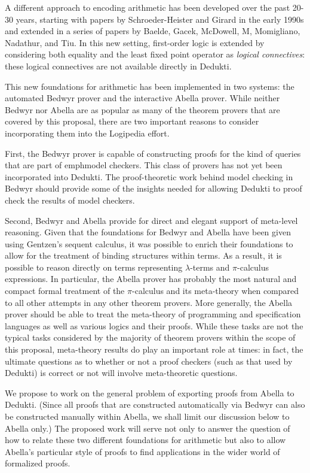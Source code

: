 \begin{workpackage}[id=theories,wphases=0-48,type=RTD,
  short=Theories in Dedukti,%
  title= Defining theories in Dedukti,
  lead=UIn,
  UInRM=10]
\begin{tasklist}
\begin{task}[id=abella,title=Express the theory of Abella in Dedukti and instrument the system]
A different approach to encoding arithmetic has been developed over
the past 20-30 years, starting with papers by Schroeder-Heister and
Girard in the early 1990s and extended in a series of papers by
Baelde, Gacek, McDowell, M, Momigliano, Nadathur, and Tiu.  In this
new setting, first-order logic is extended by considering both
equality and the least fixed point operator as \emph{logical
  connectives}: these logical connectives are not available directly
in Dedukti.

This new foundations for arithmetic has been implemented in two
systems: the automated Bedwyr prover and the interactive Abella
prover.  While neither Bedwyr nor Abella are as popular as many of the
theorem provers that are covered by this proposal, there are two
important reasons to consider incorporating them into the Logipedia
effort.

First, the Bedwyr prover is capable of constructing proofs for the
kind of queries that are part of emph{model checkers}.  This class of
provers has not yet been incorporated into Dedukti.  The
proof-theoretic work behind model checking in Bedwyr should provide
some of the insights needed for allowing Dedukti to proof check the
results of model checkers.

Second, Bedwyr and Abella provide for direct and elegant support of
meta-level reasoning.  Given that the foundations for Bedwyr and
Abella have been given using Gentzen's sequent calculus, it was
possible to enrich their foundations to allow for the treatment of
binding structures within terms.  As a result, it is possible to
reason directly on terms representing $\lambda$-terms and
$\pi$-calculus expressions.  In particular, the Abella prover has
probably the most natural and compact formal treatment of the
$\pi$-calculus and its meta-theory when compared to all other attempts
in any other theorem provers.  More generally, the Abella prover
should be able to treat the meta-theory of programming and
specification languages as well as various logics and their
proofs. While these tasks are not the typical tasks considered by the
majority of theorem provers within the scope of this proposal,
meta-theory results do play an important role at times: in fact, the
ultimate questions as to whether or not a proof checkers (such as that
used by Dedukti) is correct or not will involve meta-theoretic
questions.

We propose to work on the general problem of exporting proofs from
Abella to Dedukti.  (Since all proofs that are constructed
automatically via Bedwyr can also be constructed manually within
Abella, we shall limit our discussion below to Abella only.)  The
proposed work will serve not only to answer the question of how to
relate these two different foundations for arithmetic but also to
allow Abella's particular style of proofs to find applications in the
wider world of formalized proofs.


\end{task}
\end{tasklist}
\end{workpackage}
